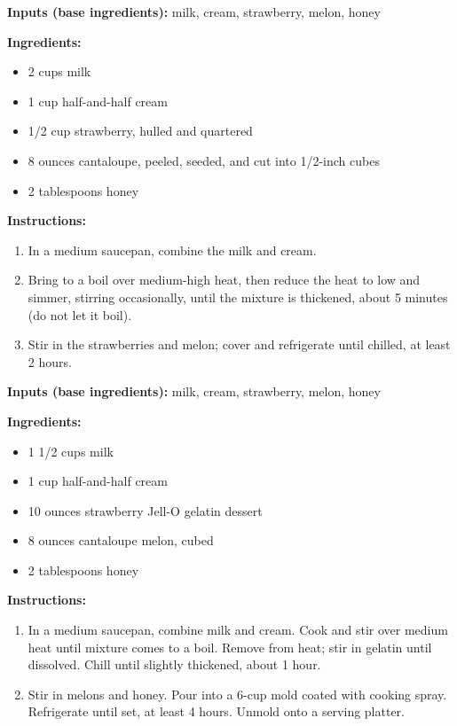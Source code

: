 \begin{tcolorbox}[recipebox={Melon and Strawberry Ice Cream}]
	\textbf{Inputs (base ingredients):} milk, cream, strawberry, melon, honey

	\vspace{0.5em}
	\textbf{Ingredients:}
	\begin{itemize}
		\item 2 cups milk
		\item 1 cup half-and-half cream
		\item 1/2 cup strawberry, hulled and quartered
		\item 8 ounces cantaloupe, peeled, seeded, and cut into 1/2-inch cubes
		\item 2 tablespoons honey
	\end{itemize}

	\vspace{0.5em}
	\textbf{Instructions:}
	\begin{enumerate}
		\item In a medium saucepan, combine the milk and cream.
		\item Bring to a boil over medium-high heat, then reduce the heat to low and simmer, stirring occasionally, until the mixture is thickened, about 5 minutes (do not let it boil).
		\item Stir in the strawberries and melon; cover and refrigerate until chilled, at least 2 hours.
	\end{enumerate}
\end{tcolorbox}

\begin{tcolorbox}[recipebox={Melon-Jello Mold}]
	\textbf{Inputs (base ingredients):} milk, cream, strawberry, melon, honey

	\vspace{0.5em}
	\textbf{Ingredients:}
	\begin{itemize}
		\item 1 1/2 cups milk
		\item 1 cup half-and-half cream
		\item 10 ounces strawberry Jell-O gelatin dessert
		\item 8 ounces cantaloupe melon, cubed
		\item 2 tablespoons honey
	\end{itemize}

	\vspace{0.5em}
	\textbf{Instructions:}
	\begin{enumerate}
		\item In a medium saucepan, combine milk and cream. Cook and stir over medium heat until mixture comes to a boil. Remove from heat; stir in gelatin until dissolved. Chill until slightly thickened, about 1 hour.
		\item Stir in melons and honey. Pour into a 6-cup mold coated with cooking spray. Refrigerate until set, at least 4 hours. Unmold onto a serving platter.
	\end{enumerate}
\end{tcolorbox}

